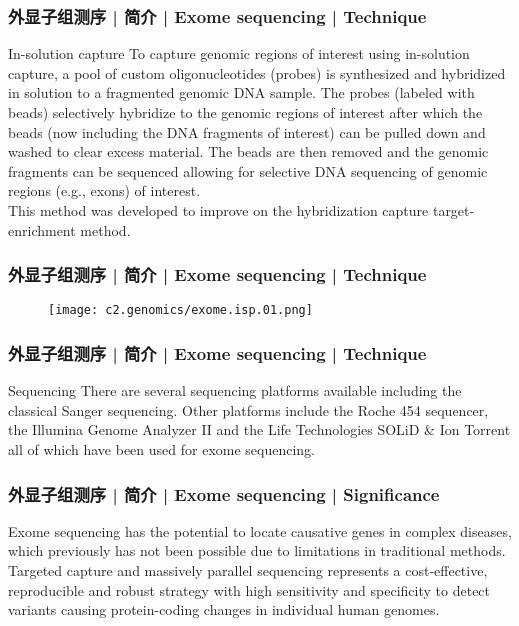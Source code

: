 \begin{frame}
  \frametitle{外显子组测序 | 简介 | Exome sequencing | Technique}
  \begin{block}{In-solution capture}
 To capture genomic regions of interest using in-solution capture, a pool of custom oligonucleotides (probes) is synthesized and hybridized in solution to a fragmented genomic DNA sample. The probes (labeled with beads) selectively hybridize to the genomic regions of interest after which the beads (now including the DNA fragments of interest) can be pulled down and washed to clear excess material. The beads are then removed and the genomic fragments can be sequenced allowing for selective DNA sequencing of genomic regions (e.g., exons) of interest.\\
 \vspace{1em}
 This method was developed to improve on the hybridization capture target-enrichment method.
  \end{block}
\end{frame}

\begin{frame}
  \frametitle{外显子组测序 | 简介 | Exome sequencing | Technique}
  \begin{figure}
    \centering
    \texttt{[image: c2.genomics/exome.isp.01.png]}
  \end{figure}
\end{frame}

\begin{frame}
  \frametitle{外显子组测序 | 简介 | Exome sequencing | Technique}
  \begin{block}{Sequencing}
 There are several sequencing platforms available including the classical Sanger sequencing. Other platforms include the Roche 454 sequencer, the Illumina Genome Analyzer II and the Life Technologies SOLiD \& Ion Torrent all of which have been used for exome sequencing. 
  \end{block}
\end{frame}

\begin{frame}
  \frametitle{外显子组测序 | 简介 | Exome sequencing | Significance}
  Exome sequencing has the potential to locate causative genes in complex diseases, which previously has not been possible due to limitations in traditional methods.\\
  \vspace{1em}
  Targeted capture and massively parallel sequencing represents a cost-effective, reproducible and robust strategy with high sensitivity and specificity to detect variants causing protein-coding changes in individual human genomes.
\end{frame}

